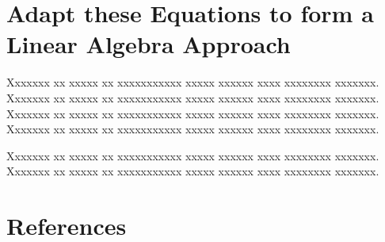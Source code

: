 \documentclass{article}
\begin{document}
\section{Adapt these Equations to form a Linear Algebra Approach}

Xxxxxxx xx xxxxx xx xxxxxxxxxxx xxxxx xxxxxx xxxx xxxxxxxx xxxxxxx.
Xxxxxxx xx xxxxx xx xxxxxxxxxxx xxxxx xxxxxx xxxx xxxxxxxx xxxxxxx.
Xxxxxxx xx xxxxx xx xxxxxxxxxxx xxxxx xxxxxx xxxx xxxxxxxx xxxxxxx.
Xxxxxxx xx xxxxx xx xxxxxxxxxxx xxxxx xxxxxx xxxx xxxxxxxx xxxxxxx.

Xxxxxxx xx xxxxx xx xxxxxxxxxxx xxxxx xxxxxx xxxx xxxxxxxx xxxxxxx.
Xxxxxxx xx xxxxx xx xxxxxxxxxxx xxxxx xxxxxx xxxx xxxxxxxx xxxxxxx.



\nocite{berns:91}
\nocite{hecht:90}
\nocite{kosko:92}


\section*{References\label{sec:cites}}






\end{document}
